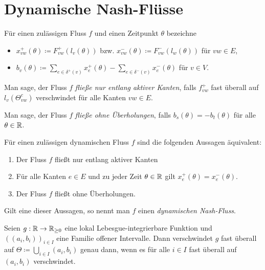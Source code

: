 \section{Dynamische Nash-Flüsse}

\begin{frame}
	\begin{definition}
		Für einen zulässigen Fluss $f$ und einen Zeitpunkt $\theta$ bezeichne
		\begin{itemize}[label=\color{darkblue}$\bullet$]
			\item $x_{vw}^+(\theta)\coloneq  F_{vw}^+(l_v(\theta))$ bzw. $x_{vw}^-(\theta)\coloneq  F^-_{vw}(l_w(\theta))$ für $vw\in E$,
			\pause\item $b_v(\theta) \coloneq  \sum_{e\in\delta^+(v)} x_e^+(\theta) - \sum_{e\in\delta^-(v)} x_e^-(\theta)$ für $v\in V$.
		\end{itemize}
	\end{definition}
	
	\pause\begin{definition}\label{def-flow-along-active-edges}
		Man sage, der Fluss $f$ \emph{fließe nur entlang aktiver Kanten}, falls $f_{vw}^+$ fast überall auf $l_v(\Theta_{vw}^c)$ verschwindet für alle Kanten $vw\in E$.
	\end{definition}

	\pause\begin{definition}
	Man sage, der Fluss $f$ \emph{fließe ohne Überholungen}, falls $b_s(\theta) = -b_t(\theta)$ für alle $\theta\in\mathbb{R}$.
	\end{definition}
\end{frame}

\begin{frame}
	\begin{theorem}\label{thm-equivalencies-nash-flow}
		Für einen zulässigen dynamischen Fluss $f$ sind die folgenden Aussagen äquivalent:
		\begin{enumerate}[label=(\roman*)]
			\item Der Fluss $f$ fließt nur entlang aktiver Kanten
			\item Für alle Kanten $e\in E$ und zu jeder Zeit $\theta\in\mathbb{R}$ gilt $x_e^+(\theta) = x_e^-(\theta)$.
			\item Der Fluss $f$ fließt ohne Überholungen.
		\end{enumerate}
		Gilt eine dieser Aussagen, so nennt man $f$ einen \emph{dynamischen Nash-Fluss}.
	\end{theorem}

	\pause\begin{lemma}\label{lemma-vanishes-intervals}
		Seien $g: \mathbb{R} \to \mathbb{R}_{\geq 0}$ eine lokal Lebesgue-integrierbare Funktion und $((a_i, b_i))_{i\in I}$ eine Familie offener Intervalle.
		Dann verschwindet $g$ fast überall auf $\Theta\coloneq \bigcup_{i\in I} (a_i, b_i)$ genau dann, wenn es für alle $i\in I$ fast überall auf $(a_i, b_i)$ verschwindet.
	\end{lemma}
\end{frame}
